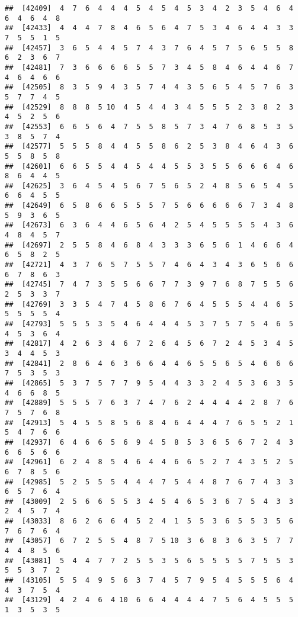 \documentclass[
]{book}
\begin{document}
\begin{verbatim}
##  [42409]  4  7  6  4  4  4  5  4  5  4  5  3  4  2  3  5  4  6  4  6  4  6  4  8
##  [42433]  4  4  4  7  8  4  6  5  6  4  7  5  3  4  6  4  4  3  3  7  5  5  1  5
##  [42457]  3  6  5  4  4  5  7  4  3  7  6  4  5  7  5  6  5  5  8  6  2  3  6  7
##  [42481]  7  3  6  6  6  6  5  5  7  3  4  5  8  4  6  4  4  6  7  4  6  4  6  6
##  [42505]  8  3  5  9  4  3  5  7  4  4  3  5  6  5  4  5  7  6  3  5  7  7  4  5
##  [42529]  8  8  8  5 10  4  5  4  4  3  4  5  5  5  2  3  8  2  3  4  5  2  5  6
##  [42553]  6  6  5  6  4  7  5  5  8  5  7  3  4  7  6  8  5  3  5  3  8  5  7  4
##  [42577]  5  5  5  8  4  4  5  5  8  6  2  5  3  8  4  6  4  3  6  5  5  8  5  8
##  [42601]  6  6  5  5  4  4  5  4  4  5  5  3  5  5  6  6  6  4  6  8  6  4  4  5
##  [42625]  3  6  4  5  4  5  6  7  5  6  5  2  4  8  5  6  5  4  5  6  6  4  5  5
##  [42649]  6  5  8  6  6  5  5  5  7  5  6  6  6  6  6  7  3  4  8  5  9  3  6  5
##  [42673]  6  3  6  4  4  6  5  6  4  2  5  4  5  5  5  5  4  3  6  4  8  4  5  7
##  [42697]  2  5  5  8  4  6  8  4  3  3  3  6  5  6  1  4  6  6  4  6  5  8  2  5
##  [42721]  4  3  7  6  5  7  5  5  7  4  6  4  3  4  3  6  5  6  6  6  7  8  6  3
##  [42745]  7  4  7  3  5  5  6  6  7  7  3  9  7  6  8  7  5  5  6  2  5  3  3  7
##  [42769]  3  3  5  4  7  4  5  8  6  7  6  4  5  5  5  4  4  6  5  5  5  5  5  4
##  [42793]  5  5  5  3  5  4  6  4  4  4  5  3  7  5  7  5  4  6  5  4  5  3  6  4
##  [42817]  4  2  6  3  4  6  7  2  6  4  5  6  7  2  4  5  3  4  5  3  4  4  5  3
##  [42841]  2  8  6  4  6  3  6  6  4  4  6  5  5  6  5  4  6  6  6  7  5  3  5  3
##  [42865]  5  3  7  5  7  7  9  5  4  4  3  3  2  4  5  3  6  3  5  4  6  6  8  5
##  [42889]  5  5  5  7  6  3  7  4  7  6  2  4  4  4  4  2  8  7  6  7  5  7  6  8
##  [42913]  5  4  5  5  8  5  6  8  4  6  4  4  4  7  6  5  5  2  1  5  4  7  6  6
##  [42937]  6  4  6  6  5  6  9  4  5  8  5  3  6  5  6  7  2  4  3  6  6  5  6  6
##  [42961]  6  2  4  8  5  4  6  4  4  6  6  5  2  7  4  3  5  2  5  6  7  8  5  6
##  [42985]  5  2  5  5  5  4  4  4  7  5  4  4  8  7  6  7  4  3  3  6  5  7  6  4
##  [43009]  2  5  6  6  5  5  3  4  5  4  6  5  3  6  7  5  4  3  3  2  4  5  7  4
##  [43033]  8  6  2  6  6  4  5  2  4  1  5  5  3  6  5  5  3  5  6  7  6  7  6  4
##  [43057]  6  7  2  5  5  4  8  7  5 10  3  6  8  3  6  3  5  7  7  4  4  8  5  6
##  [43081]  5  4  4  7  7  2  5  5  3  5  6  5  5  5  5  7  5  5  3  5  5  3  7  2
##  [43105]  5  5  4  9  5  6  3  7  4  5  7  9  5  4  5  5  5  6  4  4  3  7  5  4
##  [43129]  4  2  4  6  4 10  6  6  4  4  4  4  7  5  6  4  5  5  5  1  3  5  3  5

\end{verbatim}
\end{document}
